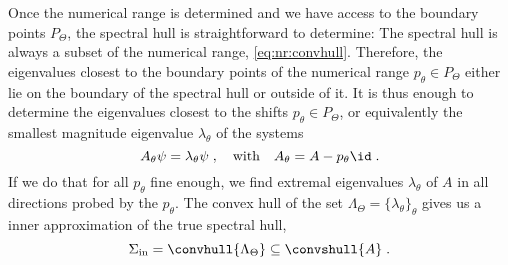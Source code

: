Once the numerical range is determined and we have access to the boundary points $P_{\Theta}$, the spectral hull is straightforward to determine:
The spectral hull is always a subset of the numerical range, \cref{eq:nr:convhull}.
Therefore, the eigenvalues closest to the boundary points of the numerical range $p_{\theta} \in P_{\Theta}$ either lie on the boundary of the spectral hull or outside of it.
It is thus enough to determine the eigenvalues closest to the shifts $p_{\theta} \in P_{\Theta}$, or equivalently the smallest magnitude eigenvalue $\lambda_{\theta}$ of the systems
\begin{equation}
A_{\theta} \psi = \lambda_{\theta} \psi \;,
\quad
\text{with}
\quad
A_{\theta} = A - p_{\theta} \id \;.
\end{equation}
If we do that for all $p_{\theta}$ fine enough, we find extremal eigenvalues $\lambda_{\theta}$ of $A$ in all directions probed by the $p_{\theta}$.
The convex hull of the set $\Lambda_{\Theta} = \{ \lambda_{\theta} \}_{\theta}$ gives us a inner approximation of the true spectral hull,
\begin{equation}
\Sigma_{\text{in}} = \convhull{ \Lambda_{\Theta} } \subseteq \convshull{A} \;.
\end{equation}

